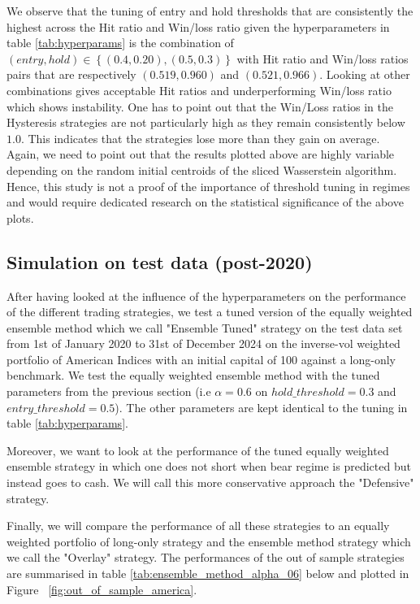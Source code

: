 \documentclass[12pt,a4paper]{report}
\begin{document}
We observe that the tuning of entry and hold thresholds that are consistently the highest across the Hit ratio and Win/loss ratio given the hyperparameters in table \ref{tab:hyperparams} is 
the combination of $\left(entry, hold\right)  \in \left\{(0.4, 0.20), (0.5, 0.3)\right\}$ with Hit ratio and Win/loss ratios pairs that are respectively $(0.519, 0.960)$ and $(0.521, 0.966)$.
Looking at other combinations gives acceptable Hit ratios and underperforming Win/loss ratio which shows instability. 
One has to point out that the Win/Loss ratios in the Hysteresis strategies are not particularly high as they remain consistently below $1.0$. This indicates that the strategies lose more than they gain on average.
Again, we need to point out that the results plotted above are highly variable depending on the random initial centroids of the sliced Wasserstein algorithm. Hence, this study is not a proof of the importance of threshold tuning in regimes and would require dedicated research on the statistical significance of the above plots.

\subsection{Simulation on test data (post-2020)}
After having looked at the influence of the hyperparameters on the performance of the different trading strategies, we test a tuned version of the equally weighted ensemble method which we call "Ensemble Tuned" strategy on the test data set from 1st of January 2020 to 31st of December 2024 on the inverse-vol weighted portfolio of American Indices with an initial capital of 100 against a long-only benchmark.
We test the equally weighted ensemble method with the tuned parameters from the previous section (i.e $\alpha = 0.6$ on $hold\_threshold = 0.3$ and $entry\_threshold = 0.5$).
The other parameters are kept identical to the tuning in table \ref{tab:hyperparams}.

Moreover, we want to look at the performance of the tuned equally weighted ensemble strategy in which one does not short when bear regime is predicted but instead goes to cash. 
We will call this more conservative approach the "Defensive" strategy.

Finally, we will compare the performance of all these strategies to an equally weighted portfolio of long-only strategy and the ensemble method strategy which we call the "Overlay" strategy.
The performances of the out of sample strategies are summarised in table \ref{tab:ensemble_method_alpha_06} below and plotted in Figure ~\ref{fig:out_of_sample_america}. 
\end{document}
